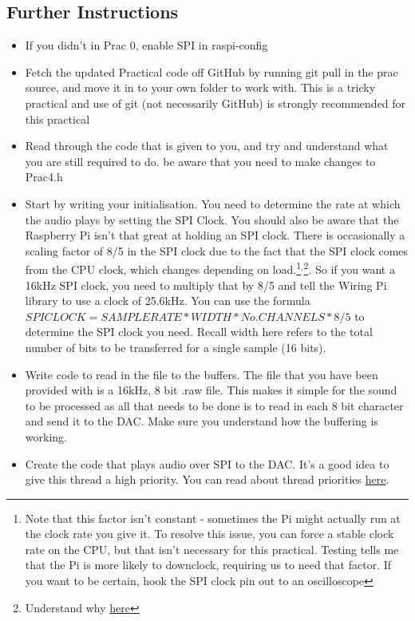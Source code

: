 \subsection{Further Instructions}
\begin{itemize}
    \item If you didn't in Prac 0, enable SPI in raspi-config
    \item Fetch the updated Practical code off GitHub by running git pull in the prac source, and move it in to your own folder to work with. This is a tricky practical and use of git (not necessarily GitHub) is strongly recommended for this practical
    \item Read through the code that is given to you, and try and understand what you are still required to do. be aware that you need to make changes to Prac4.h
    \item Start by writing your initialisation. You need to determine the rate at which the audio plays by setting the SPI Clock. You should also be aware that the Raspberry Pi isn't that great at holding an SPI clock. There is occasionally a scaling factor of 8/5 in the SPI clock due to the fact that the SPI clock comes from the CPU clock, which changes depending on load.\footnote{Note that this factor isn't constant - sometimes the Pi might actually run at the clock rate you give it. To resolve this issue, you can force a stable clock rate on the CPU, but that isn't necessary for this practical. Testing tells me that the Pi is more likely to downclock, requiring us to need that factor. If you want to be certain, hook the SPI clock pin out to an oscilloscope}$^,$\footnote{Understand why \href{https://github.com/raspberrypi/linux/issues/2094}{here}}. So if you want a 16kHz SPI clock, you need to multiply that by 8/5 and tell the Wiring Pi library to use a clock of 25.6kHz. You can use the formula $SPICLOCK = SAMPLE RATE * WIDTH * No. CHANNELS * 8/5$ to determine the SPI clock you need. Recall width here refers to the total number of bits to be transferred for a single sample (16 bits).
    \item Write code to read in the file to the buffers. The file that you have been provided with is a 16kHz, 8 bit .raw file. This makes it simple for the sound to be processed as all that needs to be done is to read in each 8 bit character and send it to the DAC. Make sure you understand how the buffering is working.
    \item Create the code that plays audio over SPI to the DAC. It's a good idea to give this thread a high priority. You can read about thread priorities \href{https://docs.oracle.com/cd/E19455-01/806-5257/attrib-16/index.html}{here}.

\end{itemize}
